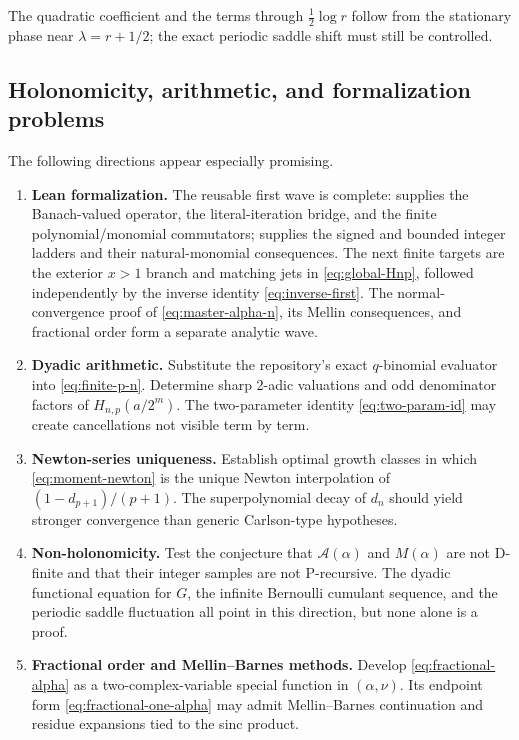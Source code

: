 \documentclass[11pt,oneside]{article}
\theoremstyle{definition}
\theoremstyle{remark}
\newcommand{\1}{\mathbf 1}
\begin{document}
The quadratic coefficient and the terms through \(\frac12\log r\) follow from
the stationary phase near \(\lambda=r+1/2\); the exact periodic saddle shift
must still be controlled.

\subsection{Holonomicity, arithmetic, and formalization problems}
The following directions appear especially promising.
\begin{enumerate}
\item \textbf{Lean formalization.}  The reusable first wave is complete:
 supplies the Banach-valued operator,
the literal-iteration bridge, and the finite polynomial/monomial commutators;
 supplies the signed and bounded
integer ladders and their natural-monomial consequences.  The next finite
targets are the exterior \(x>1\) branch and matching jets in
\eqref{eq:global-Hnp}, followed independently by the inverse identity
\eqref{eq:inverse-first}.  The normal-convergence proof of
\eqref{eq:master-alpha-n}, its Mellin consequences, and fractional order form
a separate analytic wave.

\item \textbf{Dyadic arithmetic.}  Substitute the repository's exact
\(q\)-binomial evaluator into \eqref{eq:finite-p-n}.  Determine sharp
2-adic valuations and odd denominator factors of
\(H_{n,p}(a/2^m)\).  The two-parameter identity
\eqref{eq:two-param-id} may create cancellations not visible term by term.

\item \textbf{Newton-series uniqueness.}  Establish optimal growth classes in
which \eqref{eq:moment-newton} is the unique Newton interpolation of
\((1-d_{p+1})/(p+1)\).  The superpolynomial decay of \(d_n\) should yield
stronger convergence than generic Carlson-type hypotheses.

\item \textbf{Non-holonomicity.}  Test the conjecture that
\(\mathcal A(\alpha)\) and \(M(\alpha)\) are not D-finite and that their
integer samples are not P-recursive.  The dyadic functional equation for
\(G\), the infinite Bernoulli cumulant sequence, and the periodic saddle
fluctuation all point in this direction, but none alone is a proof.

\item \textbf{Fractional order and Mellin--Barnes methods.}  Develop
\eqref{eq:fractional-alpha} as a two-complex-variable special function in
\((\alpha,\nu)\).  Its endpoint form \eqref{eq:fractional-one-alpha} may admit
Mellin--Barnes continuation and residue expansions tied to the sinc product.


\end{enumerate}
\end{document}
